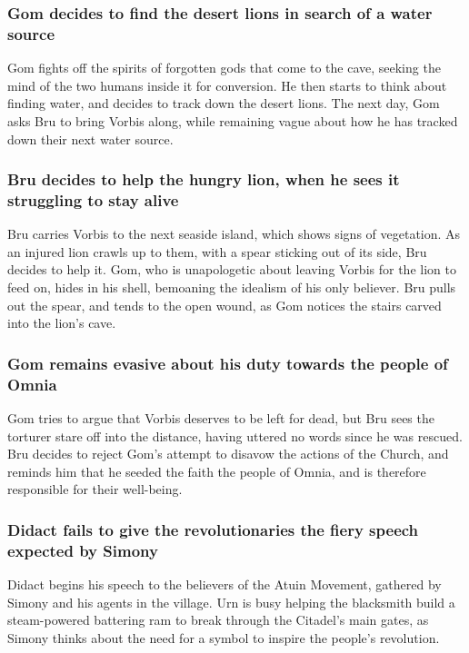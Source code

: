 \subsubsection{\Gls{Gom} decides to find the desert lions in search of a water source}
\Gls{Gom} fights off the spirits of forgotten gods that come to the cave, seeking the mind of
the two humans inside it for conversion. He then starts to think about finding water, and decides to
track down the desert lions. The next day, \Gls{Gom} asks \Gls{Bru} to bring \Gls{Vorbis} along,
while remaining vague about how he has tracked down their next water source.

\subsubsection{\Gls{Bru} decides to help the hungry lion, when he sees it struggling to stay alive}
\Gls{Bru} carries \Gls{Vorbis} to the next seaside island, which shows signs of vegetation. As an
injured lion crawls up to them, with a spear sticking out of its side, \Gls{Bru} decides to help it.
\Gls{Gom}, who is unapologetic about leaving \Gls{Vorbis} for the lion to feed on, hides in his
shell, bemoaning the idealism of his only believer. \Gls{Bru} pulls out the spear, and tends to the
open wound, as \Gls{Gom} notices the stairs carved into the lion's cave.

\subsubsection{\Gls{Gom} remains evasive about his duty towards the people of Omnia}
\Gls{Gom} tries to argue that \Gls{Vorbis} deserves to be left for dead, but \Gls{Bru} sees the
torturer stare off into the distance, having uttered no words since he was rescued. \Gls{Bru}
decides to reject \Gls{Gom}'s attempt to disavow the actions of the Church, and reminds him that he
seeded the faith the people of Omnia, and is therefore responsible for their well-being.

\subsubsection{\Gls{Didact} fails to give the revolutionaries the fiery speech expected by
    \Gls{Simony}}
\Gls{Didact} begins his speech to the believers of the \Gls{Atuin} Movement, gathered by
\Gls{Simony} and his agents in the village. \Gls{Urn} is busy helping the blacksmith build a
steam-powered battering ram to break through the Citadel's main gates, as \Gls{Simony} thinks about
the need for a symbol to inspire the people's revolution.

